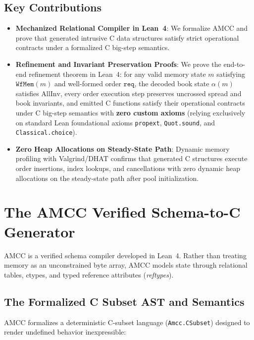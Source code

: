 \documentclass[11pt,a4paper]{article}
\begin{document}
\subsection{Key Contributions}
\begin{itemize}[leftmargin=*]
    \item \textbf{Mechanized Relational Compiler in Lean~4}: We formalize AMCC and prove that generated intrusive C data structures satisfy strict operational contracts under a formalized C big-step semantics.
    \item \textbf{Refinement and Invariant Preservation Proofs}: We prove the end-to-end refinement theorem in Lean~4: for any valid memory state $m$ satisfying $\mathtt{WfMem}(m)$ and well-formed order $\mathtt{req}$, the decoded book state $\alpha(m)$ satisfies $\mathrm{AllInv}$, every order execution step preserves uncrossed spread and book invariants, and emitted C functions satisfy their operational contracts under C big-step semantics with \textbf{zero custom axioms} (relying exclusively on standard Lean foundational axioms \texttt{propext}, \texttt{Quot.sound}, and \texttt{Classical.choice}).
    \item \textbf{Zero Heap Allocations on Steady-State Path}: Dynamic memory profiling with Valgrind/DHAT confirms that generated C structures execute order insertions, index lookups, and cancellations with zero dynamic heap allocations on the steady-state path after pool initialization.
\end{itemize}

\section{The AMCC Verified Schema-to-C Generator}
\label{sec:amcc}

AMCC is a verified schema compiler developed in Lean~4. Rather than treating memory as an unconstrained byte array, AMCC models state through relational tables, ctypes, and typed reference attributes (\emph{reftypes}).

\subsection{The Formalized C Subset AST and Semantics}

AMCC formalizes a deterministic C-subset language (\texttt{Amcc.CSubset}) designed to render undefined behavior inexpressible:
\end{document}
